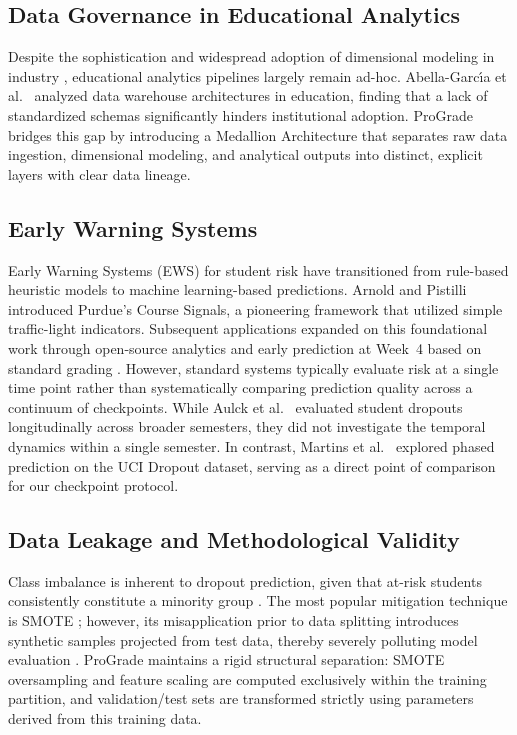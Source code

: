 \documentclass[conference,a4paper]{IEEEtran}
\begin{document}
\subsection{Data Governance in Educational Analytics}
Despite the sophistication and widespread adoption of dimensional modeling in industry \cite{kimball2013dw}, educational analytics pipelines largely remain ad-hoc. Abella-Garc{\'\i}a et al.\ \cite{abelladosantos2019edudw} analyzed data warehouse architectures in education, finding that a lack of standardized schemas significantly hinders institutional adoption. ProGrade bridges this gap by introducing a Medallion Architecture that separates raw data ingestion, dimensional modeling, and analytical outputs into distinct, explicit layers with clear data lineage.

\subsection{Early Warning Systems}
Early Warning Systems (EWS) for student risk have transitioned from rule-based heuristic models to machine learning-based predictions. Arnold and Pistilli \cite{arnold2012ews} introduced Purdue's Course Signals, a pioneering framework that utilized simple traffic-light indicators. Subsequent applications expanded on this foundational work through open-source analytics \cite{jayaprakash2014ews} and early prediction at Week~4 based on standard grading \cite{marbouti2016ews}. However, standard systems typically evaluate risk at a single time point rather than systematically comparing prediction quality across a continuum of checkpoints. While Aulck et al.\ \cite{aulck2020temporal} evaluated student dropouts longitudinally across broader semesters, they did not investigate the temporal dynamics within a single semester. In contrast, Martins et al.\ \cite{martins2023phased} explored phased prediction on the UCI Dropout dataset, serving as a direct point of comparison for our checkpoint protocol.

\subsection{Data Leakage and Methodological Validity}
Class imbalance is inherent to dropout prediction, given that at-risk students consistently constitute a minority group \cite{fernandez2018smotesurvey}. The most popular mitigation technique is SMOTE \cite{chawla2002smote}; however, its misapplication prior to data splitting introduces synthetic samples projected from test data, thereby severely polluting model evaluation \cite{romero2020}. ProGrade maintains a rigid structural separation: SMOTE oversampling and feature scaling are computed exclusively within the training partition, and validation/test sets are transformed strictly using parameters derived from this training data.
\end{document}
